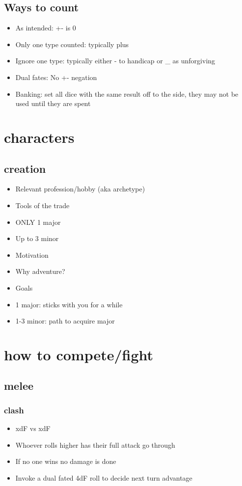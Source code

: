 \documentclass[10pt,letterpaper]{article}
\begin{document}
\subsection{Ways to count}
\begin{itemize}
  \item  As intended: +- is 0
  \item  Only one type counted: typically plus
  \item  Ignore one type: typically either - to handicap or \_ as unforgiving
  \item  Dual fates: No +- negation
  \item  Banking: set all dice with the same result off to the side, they may not be used until they are spent
\end{itemize}
\section{characters}
\subsection{creation}
\begin{itemize}
  \item  Relevant profession/hobby (aka archetype)
  \item  Tools of the trade
  \item  ONLY 1 major
  \item  Up to 3 minor
  \item  Motivation
  \item  Why adventure?
  \item  Goals
  \item  1 major: sticks with you for a while
  \item  1-3 minor: path to acquire major
\end{itemize}
\section{how to compete/fight}
\subsection{melee}
\subsubsection{clash}
\begin{itemize}
  \item  xdF vs xdF
  \item  Whoever rolls higher has their full attack go through
  \item  If no one wins no damage is done
  \item  Invoke a dual fated 4dF roll to decide next turn advantage
\end{itemize}
\end{document}
